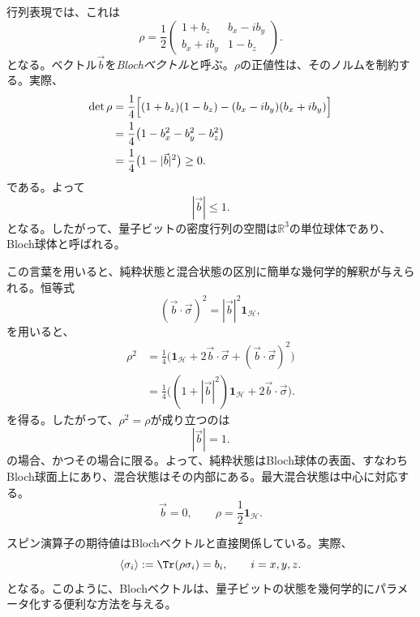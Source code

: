 \documentclass[a4paper,11pt,oneside]{article}
\theoremstyle{definition}
\numberwithin{equation}{section}
\begin{document}
行列表現では、これは
\begin{equation}
\rho
=
\frac12
\begin{pmatrix}
1+b_z & b_x-i b_y \\
b_x+i b_y & 1-b_z
\end{pmatrix} .
\end{equation}
となる。ベクトル$\vec b$を\textit{Blochベクトル}と呼ぶ。$\rho$の正値性は、そのノルムを制約する。実際、
\begin{align}
\det \rho
&=
\frac14 \Bigl[(1+b_z)(1-b_z)-(b_x-i b_y)(b_x+i b_y)\Bigr]
\nonumber\\
&=
\frac14 \bigl(1-b_x^{2}-b_y^{2}-b_z^{2}\bigr)
\nonumber\\
&=
\frac14 \bigl(1-|\vec b|^{2}\bigr) \geq 0 .
\end{align}
である。よって
\begin{equation}
|\vec b|\leq 1 .
\end{equation}
となる。したがって、量子ビットの密度行列の空間は$\mathbb{R}^{3}$の単位球体であり、Bloch球体と呼ばれる。



この言葉を用いると、純粋状態と混合状態の区別に簡単な幾何学的解釈が与えられる。恒等式
\begin{equation}
(\vec b\cdot \vec \sigma)^{2}=|\vec b|^{2}\mathbf{1}_{\mathcal H} ,
\end{equation}
を用いると、
\begin{align}
\rho^{2}
&=
\frac14
\bigl(\mathbf{1}_{\mathcal H}+2\vec b\cdot\vec \sigma+(\vec b\cdot\vec \sigma)^{2}\bigr)
\nonumber\\
&=
\frac14
\bigl((1+|\vec b|^{2})\mathbf{1}_{\mathcal H}+2\vec b\cdot\vec \sigma\bigr) .
\end{align}
を得る。したがって、$\rho^{2}=\rho$が成り立つのは
\begin{equation}
|\vec b|=1 .
\end{equation}
の場合、かつその場合に限る。よって、純粋状態はBloch球体の表面、すなわちBloch球面上にあり、混合状態はその内部にある。最大混合状態は中心に対応する。
\begin{equation}
\vec b = 0,
\qquad
\rho = \frac12 \mathbf{1}_{\mathcal H} .
\end{equation}


スピン演算子の期待値はBlochベクトルと直接関係している。実際、
\begin{equation}
\langle \sigma_i\rangle
:= \Tr(\rho \sigma_i)=b_i ,
\qquad i=x,y,z .
\end{equation}
となる。このように、Blochベクトルは、量子ビットの状態を幾何学的にパラメータ化する便利な方法を与える。
\end{document}
